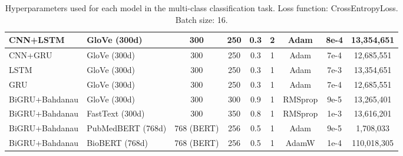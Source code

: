 \documentclass[12pt]{report}
\begin{document}
\begin{table}[H]
{\begin{tabular}{|l|l|c|c|c|c|c|c|c|}
CNN+LSTM       & GloVe (300d)            & 300                    & 250                 & 0.3              & 2                   & Adam               & 8e-4                        & 13,354,651 \\ \hline
CNN+GRU        & GloVe (300d)            & 300                    & 250                 & 0.3              & 1                   & Adam               & 7e-4                        & 12,685,551 \\ \hline
LSTM           & GloVe (300d)            & 300                    & 250                 & 0.3              & 1                   & Adam               & 7e-3                        & 13,354,651 \\ \hline
GRU            & GloVe (300d)            & 300                    & 250                 & 0.3              & 1                   & Adam               & 7e-4                        & 12,685,551 \\ \hline

BiGRU+Bahdanau & GloVe (300d)            & 300                    & 300                 & 0.9              & 1                   & RMSprop            & 9e-5                        & 13,265,401 \\ \hline
BiGRU+Bahdanau & FastText (300d)         & 300                    & 350                 & 0.8              & 1                   & RMSprop            & 1e-3                        & 13,616,201 \\ \hline
BiGRU+Bahdanau & PubMedBERT (768d)             & 768 (BERT)            & 256                 & 0.5              & 1                   & Adam               & 9e-5                        & 1,708,033 \\ \hline
BiGRU+Bahdanau & BioBERT (768d)             & 768 (BERT)            & 256                 & 0.5              & 1                   & AdamW              & 1e-4                        & 110,018,305 \\ \hline

\end{tabular}
}
\caption{Hyperparameters used for each model in the multi-class classification task. Loss function: CrossEntropyLoss. Batch size: 16.}
\label{tab:hyperparams_multiclass}
\end{table}
\end{document}

